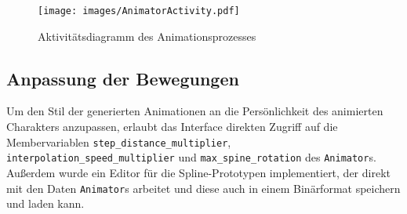 \begin{figure}
    \centering
    \texttt{[image: images/AnimatorActivity.pdf]}
    \caption{Aktivitätsdiagramm des Animationsprozesses}
    \label{uml_activity}
\end{figure}

\subsection{Anpassung der Bewegungen}
Um den Stil der generierten Animationen an die Persönlichkeit des animierten Charakters anzupassen, erlaubt das Interface direkten Zugriff auf die Membervariablen \lstinline{step_distance_multiplier}, \lstinline{interpolation_speed_multiplier} und \lstinline{max_spine_rotation} des \lstinline{Animator}s. Außerdem wurde ein Editor für die Spline-Prototypen implementiert, der direkt mit den Daten \lstinline{Animator}s arbeitet und diese auch in einem Binärformat speichern und laden kann.